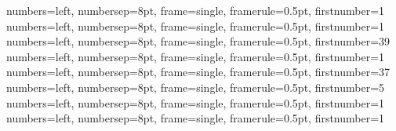 {numbers=left, numbersep=8pt, frame=single, framerule=0.5pt, firstnumber=1}
{numbers=left, numbersep=8pt, frame=single, framerule=0.5pt, firstnumber=1}
{numbers=left, numbersep=8pt, frame=single, framerule=0.5pt, firstnumber=39}
{numbers=left, numbersep=8pt, frame=single, framerule=0.5pt, firstnumber=1}
{numbers=left, numbersep=8pt, frame=single, framerule=0.5pt, firstnumber=37}
{numbers=left, numbersep=8pt, frame=single, framerule=0.5pt, firstnumber=5}
{numbers=left, numbersep=8pt, frame=single, framerule=0.5pt, firstnumber=1}
{numbers=left, numbersep=8pt, frame=single, framerule=0.5pt, firstnumber=1}